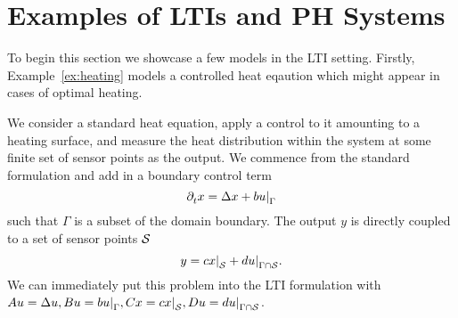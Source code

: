 \section{Examples of \acp{LTI} and \ac{PH} Systems}

To begin this section we showcase a few models in the \ac{LTI} setting.
Firstly, Example~\ref{ex:heating} models a controlled heat eqaution which might appear in cases of optimal heating.

\begin{example}\label{ex:heating}
    We consider a standard heat equation, apply a control to it amounting to a heating surface, and measure the heat distribution within the system at some finite set of sensor points as the output.
    We commence from the standard formulation and add in a boundary control term
    \begin{equation*}
        \pd[t]{} x = \lapl{x} + b \res{u}{\Gamma}
    \end{equation*}
    such that $\Gamma$ is a subset of the domain boundary.
    The output $y$ is directly coupled to a set of sensor points $\mathcal{S}$
    \begin{equation*}
        y = c \res{x}{\mcl{S}} + d \res{u}{\Gamma \cap \mcl{S}}.
    \end{equation*}
    We can immediately put this problem into the \ac{LTI} formulation with $A u = \lapl{u}, B u = b \res{u}{\Gamma}, C x = c \res{x}{\mcl{S}}, D u = d \res{u}{\Gamma \cap \mcl{S}}$.
\end{example}

